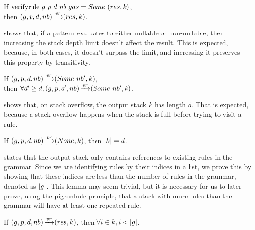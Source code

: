 \begin{lemma}
    If $\text{verifyrule}{}\ g\ p\ d\ nb\ gas = Some\ (res, k)$, \\
    then $(g,p,d,nb) \operatorname{\xrightarrow{\mathit{vr}}} (res,k)$.
    \label{lemma:vr-follows}
\end{lemma}

 shows that,
if a pattern evaluates to either nullable or non-nullable,
then increasing the stack depth limit
doesn't affect the result.
This is expected,
because, in both cases,
it doesn't surpass the limit,
and increasing it preserves this property
by transitivity.

\begin{lemma}%
    If $(g,p,d,nb) \operatorname{\xrightarrow{\mathit{vr}}} (Some\ nb',k)$, \\
    then $\forall d' \ge d, (g,p,d',nb) \operatorname{\xrightarrow{\mathit{vr}}} (Some\ nb',k)$.
    \label{lemma:stack-depth-monotonicity-not-lr-pattern}
\end{lemma}

 shows that,
on stack overflow,
the output stack $k$ has length $d$.
That is expected,
because a stack overflow happens
when the stack is full
before trying to visit a rule.

\begin{lemma}%
    If $(g,p,d,nb) \operatorname{\xrightarrow{\mathit{vr}}} (None,k)$,
    then $|k| = d$.
    \label{lemma:stack-depth-lr-pattern}
\end{lemma}

 states
that the output stack
only contains references to
existing rules in the grammar.
Since we are identifying rules
by their indices in a list,
we prove this by showing that these indices
are less than the number of rules in the grammar,
denoted as $|g|$.
This lemma may seem trivial,
but it is necessary for us to later prove,
using the pigeonhole principle,
that a stack with more rules than the grammar
will have at least one repeated rule.

\begin{lemma}%
    If $(g,p,d,nb) \operatorname{\xrightarrow{\mathit{vr}}} (res,k)$,
    then $\forall i \in k, i < |g|$.
    \label{lemma:coherent-stack}
\end{lemma}


